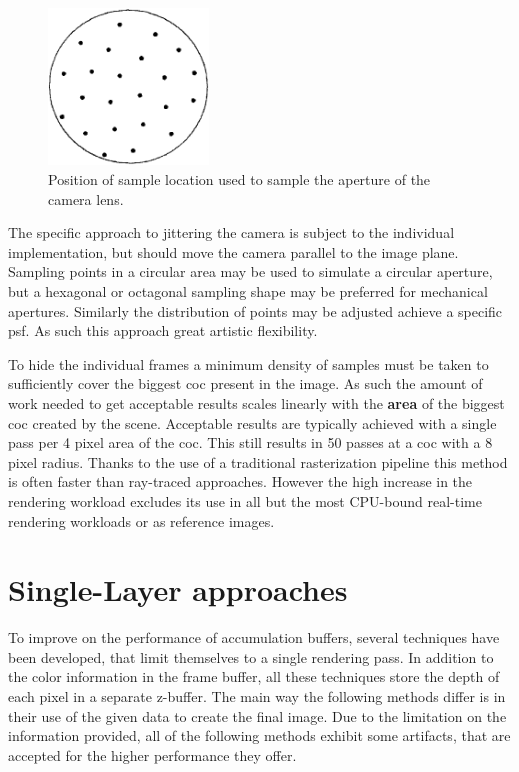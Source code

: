 \begin{figure}
\begin{center}
    \includegraphics[width=0.38\textwidth]{images/sample-locations.png}
\end{center}
\caption{Position of sample location used to sample the aperture of the camera lens. \cite{Haeberli.1990}}
\label{fig:sample-pos}
\end{figure}

The specific approach to jittering the camera is subject to the individual implementation, but should move the camera parallel to the image plane.
Sampling points in a circular area may be used to simulate a circular aperture, but a hexagonal or octagonal sampling shape may be preferred for mechanical apertures.
Similarly the distribution of points may be adjusted achieve a specific \gls{psf}.
As such this approach great artistic flexibility.

To hide the individual frames a minimum density of samples must be taken to sufficiently cover the biggest \gls{coc} present in the image.
As such the amount of work needed to get acceptable results scales linearly with the \textbf{area} of the biggest \gls{coc} created by the scene.
Acceptable results are typically achieved with a single pass per 4 pixel area of the \gls{coc}.
This still results in 50 passes at a \gls{coc} with a 8 pixel radius. \cite{Demers.2005}
Thanks to the use of a traditional rasterization pipeline this method is often faster than ray-traced approaches.
However the high increase in the rendering workload excludes its use in all but the most CPU-bound real-time rendering workloads or as reference images.

\section{Single-Layer approaches}
To improve on the performance of accumulation buffers, several techniques have been developed, that limit themselves to a single rendering pass.
In addition to the color information in the frame buffer, all these techniques store the depth of each pixel in a separate z-buffer.
The main way the following methods differ is in their use of the given data to create the final image.
Due to the limitation on the information provided, all of the following methods exhibit some artifacts, that are accepted for the higher performance they offer.

